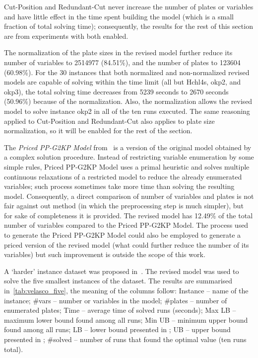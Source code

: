 \documentclass[runningheads]{llncs}
\begin{document}
Cut-Position and Redundant-Cut never increase the number of plates or variables and have little effect in the time spent building the model (which is a small fraction of total solving time); consequently, the results for the rest of this section are from experiments with both enabled.

The normalization of the plate sizes in the revised model further reduce its number of variables to 2514977 (84.51\%), and the number of plates to 123604 (60.98\%).
For the 30 instances that both normalized and non-normalized revised models are capable of solving within the time limit (all but Hchl4s, okp2, and okp3), the total solving time decreases from 5239 seconds to 2670 seconds (50.96\%) because of the normalization.
Also, the normalization allows the revised model to solve instance okp2 in all of the ten runs executed. %
The same reasoning applied to Cut-Position and Redundant-Cut also applies to plate size normalization, so it will be enabled for the rest of the section.

The \emph{Priced PP-G2KP Model} from~\cite{furini:2016} is a version of the original model obtained by a complex solution procedure.
Instead of restricting variable enumeration by some simple rules, Priced PP-G2KP Model uses a primal heuristic and solves multiple continuous relaxations of a restricted model to reduce the already enumerated variables; such process sometimes take more time than solving the resulting model.
Consequently, a direct comparison of number of variables and plates is not fair against out method (in which the preprocessing step is much simpler), but for sake of completeness it is provided.
The revised model has 12.49\% of the total number of variables compared to the Priced PP-G2KP Model.
The process used to generate the Priced PP-G2KP Model could also be employed to generate a priced version of the revised model (what could further reduce the number of its variables) but such improvement is outside the scope of this work.

A `harder' instance dataset was proposed in~\cite{velasco:2019}.
The revised model was used to solve the five smallest instances of the dataset.
The results are summarised in~\autoref{tab:velasco_five}, the meaning of the columns follow: Instance -- name of the instance; \#vars -- number or variables in the model; \#plates -- number of enumerated plates; Time -- average time of solved runs (seconds); Max LB -- maximum lower bound found among all runs; Min UB -- minimum upper bound found among all runs; \cite{velasco:2019} LB -- lower bound presented in \cite{velasco:2019}; \cite{velasco:2019} UB -- upper bound presented in \cite{velasco:2019}; \#solved -- number of runs that found the optimal value (ten runs total).
\end{document}
